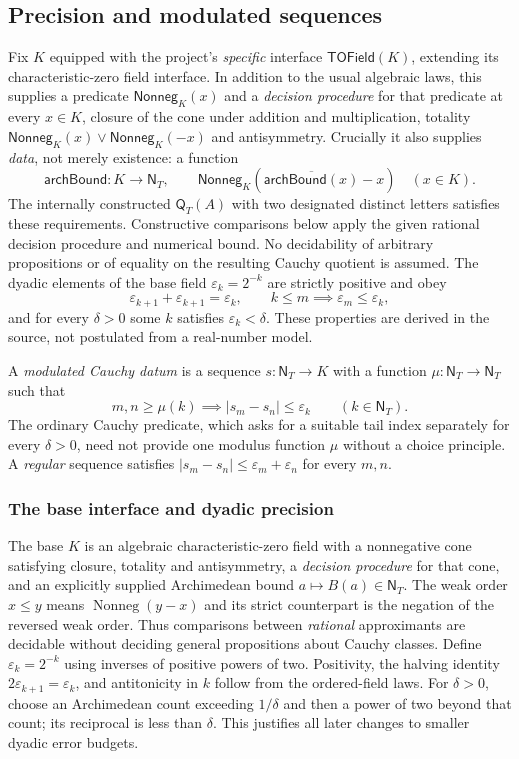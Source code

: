 \documentclass[11pt,reqno]{amsart}
\theoremstyle{definition}\newtheorem{definition}[theorem]{Definition}
\theoremstyle{remark}\newtheorem{remark}[theorem]{Remark}
\newcommand{\N}{\mathsf N_T}\newcommand{\Z}{\mathsf Z_T}\newcommand{\Q}{\mathsf Q_T}\newcommand{\RR}{\mathsf R}
\newcommand{\eps}{\varepsilon}
\begin{document}
\subsection{Precision and modulated sequences}\label{main:sub-40}
Fix $K$ equipped with the project's \emph{specific} interface $\mathsf{TOField}(K)$, extending its characteristic-zero field interface. In addition to the usual algebraic laws, this supplies a predicate $\mathsf{Nonneg}_K(x)$ and a \emph{decision procedure} for that predicate at every $x\in K$, closure of the cone under addition and multiplication, totality $\mathsf{Nonneg}_K(x)\lor\mathsf{Nonneg}_K(-x)$ and antisymmetry. Crucially it also supplies \emph{data}, not merely existence: a function
\[
 \mathsf{archBound}:K\longrightarrow\N,
 \qquad \mathsf{Nonneg}_K(\overline{\mathsf{archBound}(x)}-x)
 \quad(x\in K).
\]
The internally constructed $\Q(A)$ with two designated distinct letters satisfies these requirements. Constructive comparisons below apply the given rational decision procedure and numerical bound. No decidability of arbitrary propositions or of equality on the resulting Cauchy quotient is assumed. The dyadic elements of the base field $\eps_k=2^{-k}$ are strictly positive and obey
\[
\eps_{k+1}+\eps_{k+1}=\eps_k,\qquad
k\le m\implies \eps_m\le\eps_k,
\]
and for every $\delta>0$ some $k$ satisfies $\eps_k<\delta$. These properties are derived in the source, not postulated from a real-number model.

A \emph{modulated Cauchy datum} is a sequence $s:\N\to K$ with a function $\mu:\N\to\N$ such that
\begin{equation}\label{eq:mod}
 m,n\ge\mu(k)\implies |s_m-s_n|\le\eps_k
 \qquad(k\in\N).
\end{equation}
The ordinary Cauchy predicate, which asks for a suitable tail index separately for every $\delta>0$, need not provide one modulus function $\mu$ without a choice principle. A \emph{regular} sequence satisfies $|s_m-s_n|\le\eps_m+\eps_n$ for every $m,n$.


\medskip
\subsubsection*{The base interface and dyadic precision}\label{supp:12-1}
The base $K$ is an algebraic characteristic-zero field with a nonnegative cone satisfying closure, totality and antisymmetry, a \emph{decision procedure} for that cone, and an explicitly supplied Archimedean bound $a\mapsto B(a)\in\N$. The weak order $x\le y$ means $\operatorname{Nonneg}(y-x)$ and its strict counterpart is the negation of the reversed weak order. Thus comparisons between \emph{rational} approximants are decidable without deciding general propositions about Cauchy classes. Define $\eps_k=2^{-k}$ using inverses of positive powers of two. Positivity, the halving identity $2\eps_{k+1}=\eps_k$, and antitonicity in $k$ follow from the ordered-field laws. For $\delta>0$, choose an Archimedean count exceeding $1/\delta$ and then a power of two beyond that count; its reciprocal is less than $\delta$. This justifies all later changes to smaller dyadic error budgets.
\medskip
\medskip
\end{document}
